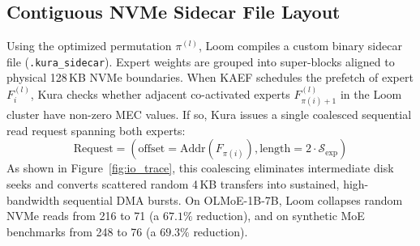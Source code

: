\subsection{Contiguous NVMe Sidecar File Layout}
Using the optimized permutation $\pi^{(l)}$, Loom compiles a custom binary sidecar file (\texttt{.kura\_sidecar}).
Expert weights are grouped into super-blocks aligned to physical 128\,KB NVMe boundaries. When KAEF schedules the prefetch of expert $F_i^{(l)}$, Kura checks whether adjacent co-activated experts $F_{\pi(i)+1}^{(l)}$ in the Loom cluster have non-zero MEC values. If so, Kura issues a single coalesced sequential read request spanning both experts:
\begin{equation}
    \text{Request} = \left( \text{offset} = \text{Addr}\left(F_{\pi(i)}\right), \text{length} = 2 \cdot \mathcal{S}_{\text{exp}} \right)
\end{equation}
As shown in Figure~\ref{fig:io_trace}, this coalescing eliminates intermediate disk seeks and converts scattered random 4\,KB transfers into sustained, high-bandwidth sequential DMA bursts.
On OLMoE-1B-7B, Loom collapses random NVMe reads from 216 to 71 (a $67.1\%$ reduction), and on synthetic MoE benchmarks from 248 to 76 (a $69.3\%$ reduction).
